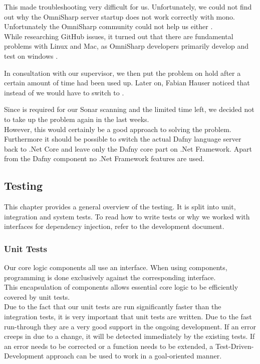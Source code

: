 This made troubleshooting very difficult for us.
Unfortunately, we could not find out why the OmniSharp server startup does not work correctly with mono.
Unfortunately the OmniSharp community could not help us either \cite{mono-slack}.\\

While researching GitHub issues, it turned out that there are fundamental problems with Linux and Mac, as OmniSharp developers primarily develop and test on windows \cite{mono-git}.

In consultation with our supervisor, we then put the problem on hold after a certain amount of time had been used up.
Later on, Fabian Hauser noticed that instead of  we would have to switch to .

Since  is required for our Sonar scanning and the limited time left,
we decided not to take up the problem again in the last weeks. \\

However, this would certainly be a good approach to solving the problem.
Furthermore it should be possible to switch the actual Dafny language server back to .Net Core
and leave only the Dafny core part on .Net Framework.
Apart from the Dafny component no .Net Framework features are used.

\subsection{Testing}

This chapter provides a general overview of the testing.
It is split into unit, integration and system tests.
To read how to write tests or why we worked with interfaces for dependency injection, refer to the development document.

\subsubsection{Unit Tests}
Our core logic components all use an interface.
When using components, programming is done exclusively against the corresponding interface. \\

This encapsulation of components allows essential core logic to be efficiently covered by unit tests. \\

Due to the fact that our unit tests are run significantly faster than the integration tests, it is very important that unit tests are written.
Due to the fast run-through they are a very good support in the ongoing development.
If an error creeps in due to a change, it will be detected immediately by the existing tests.
If an error needs to be corrected or a function needs to be extended, a Test-Driven-Development approach can be used to work in a goal-oriented manner. \\

